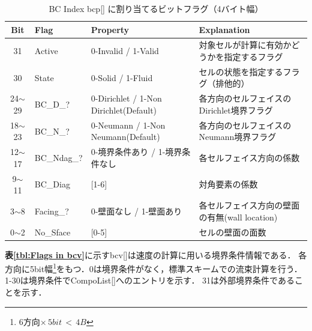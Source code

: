 \begin{table}[htdp]
\caption{BC Index bcp[] に割り当てるビットフラグ（4バイト幅）}
\begin{center}
\small
\begin{tabular}{clll} \toprule
Bit & Flag & Property & Explanation\\ \midrule
31 & Active & 0-Invalid / 1-Valid & 対象セルが計算に有効かどうかを指定するフラグ\\
30 & State  & 0-Solid / 1-Fluid & セルの状態を指定するフラグ（排他的）\\
24$\sim$29 & BC\_D\_? & 0-Dirichlet / 1-Non Dirichlet(Default) & 各方向のセルフェイスのDirichlet境界フラグ\\
18$\sim$23 & BC\_N\_? & 0-Neumann / 1-Non Neumann(Default) & 各方向のセルフェイスのNeumann境界フラグ\\
12$\sim$17 & BC\_Ndag\_? & 0-境界条件あり / 1-境界条件なし & 各セルフェイス方向の係数\\
9$\sim$11 & BC\_Diag & [1-6] & 対角要素の係数\\
3$\sim$8 & Facing\_? & 0-壁面なし / 1-壁面あり & 各セルフェイス方向の壁面の有無(wall location)\\
0$\sim$2 & No\_Sface & [0-5] & セルの壁面の面数\\ \bottomrule
\end{tabular}
\end{center}
\label{tbl:Flags in bcp}
\end{table}

\textbf{表\ref{tbl:Flags in bcv}}に示すbcv[]は速度の計算に用いる境界条件情報である．
各方向に5bit幅\footnote{6方向$\times\,5bit\,<\,4B$}をもつ．0は境界条件がなく，標準スキームでの流束計算を行う．
1-30は境界条件でCompoList[]へのエントリを示す．
31は外部境界条件であることを示す．

